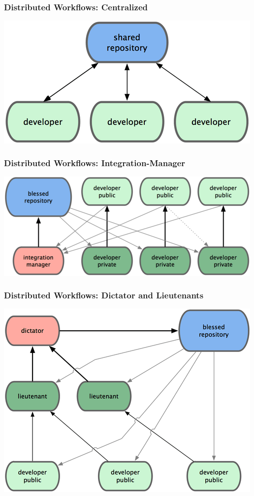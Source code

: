 \documentclass[english,compress]{beamer}
\begin{document}
\frame
{
    \frametitle{Distributed Workflows: Centralized}

    \begin{center}
        \includegraphics[width=.7\textwidth]{figs/centralized-workflow.png}
    \end{center}
}

\frame
{
    \frametitle{Distributed Workflows: Integration-Manager}

    \begin{center}
        \includegraphics[width=.7\textwidth]{figs/integration-manager-workflow.png}
    \end{center}

}

\frame
{
    \frametitle{Distributed Workflows: Dictator and Lieutenants}

    \begin{center}
        \includegraphics[width=.7\textwidth]{figs/dictator-lieutenant-workflow.png}
    \end{center}

}
\end{document}
